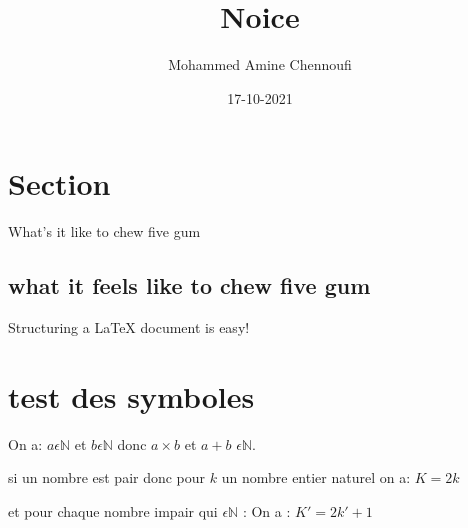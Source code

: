 \documentclass[14pt]{extarticle}
\title{Noice}
\date{17-10-2021}
\author{Mohammed Amine Chennoufi}
\begin{document}
\maketitle
{}
\newpage
{}
\section{Section}
What's it like to chew five gum
\subsection{what it feels like to chew five gum}
Structuring a {\LaTeX} document is easy!
\section{test des symboles}
On a: $ a {\epsilon} {\mathbb{N}}$ et $b \epsilon {\mathbb{N}}$
donc $ a \times b $ et $ a+b$ $ \epsilon {\mathbb{N}}$.


si un nombre est pair donc pour $k$ un nombre entier naturel on a:
$K=2k$


et pour chaque nombre impair qui $\epsilon {\mathbb{N}}$ :
On a : $ K' = 2k'+ 1$
\end{document}
